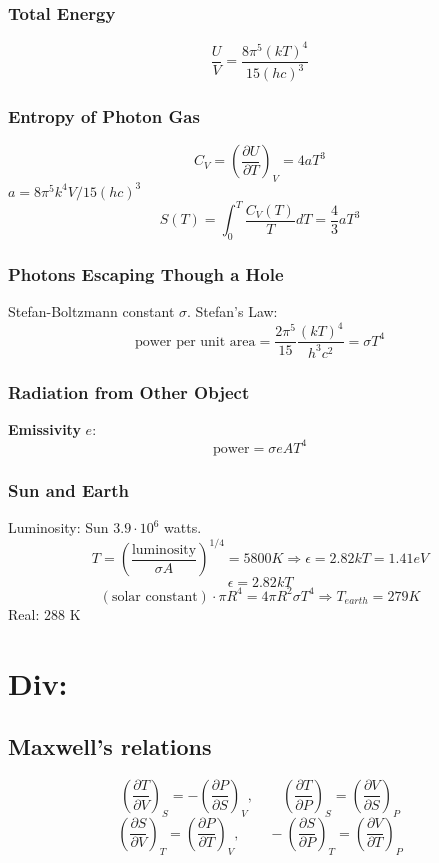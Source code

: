 \documentclass[a4paper,norsk, 10pt]{article}
\newcommand{\pd}[3]{\left(\frac{\partial #1}{\partial #2}\right)_{#3}}
\begin{document}
\subsubsection{Total Energy}
\begin{equation}
\frac{U}{V} = \frac{8\pi^5(kT)^4}{15(hc)^3}
\end{equation}
\subsubsection{Entropy of Photon Gas}
\begin{equation}
C_V = \pd{U}{T}{V} = 4aT^3
\end{equation}
$a = 8\pi^5k^4V/15(hc)^3$
\begin{equation}
S(T) = \int_0^T\frac{C_V(T)}{T}dT = \frac{4}{3}aT^3
\end{equation}
\subsubsection{Photons Escaping Though a Hole}
Stefan-Boltzmann constant $\sigma$. Stefan's Law:
\begin{equation}
\text{power per unit area} = \frac{2\pi^5}{15}\frac{(kT)^4}{h^3c^2} = \sigma T^4
\end{equation}
\subsubsection{Radiation from Other Object}
\textbf{Emissivity} $e$:
\begin{equation}
\text{power} = \sigma e A T^4
\end{equation}
\subsubsection{Sun and Earth}
Luminosity: Sun $3.9\cdot 10^{6}$ watts.
\begin{equation}
T = \left(\frac{\text{luminosity}}{\sigma A}\right)^{1/4} = 5800 K \Rightarrow\epsilon = 2.82kT = 1.41 eV
\end{equation}
\begin{equation}
\epsilon = 2.82kT
\end{equation}
\begin{equation}
(\text{solar constant}) \cdot \pi R^4 = 4\pi R^2 \sigma T^4 \Rightarrow T_{earth} = 279 K
\end{equation}
Real: $288$ K

\section{Div:}
\subsection{Maxwell's relations}
\begin{equation}
\pd{T}{V}{S} = -\pd{P}{S}{V}, \qquad \pd{T}{P}{S} = \pd{V}{S}{P}
\end{equation}
\begin{equation}
\pd{S}{V}{T} = \pd{P}{T}{V}, \qquad -\pd{S}{P}{T} = \pd{V}{T}{P}
\end{equation}
\end{document}

